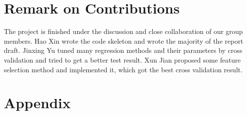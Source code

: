 \documentclass{article}
\begin{document}


\section{Remark on Contributions}
The project is finished under the discussion and close collaboration of our group members. Hao Xin wrote the code skeleton and wrote the majority of the report draft. Jinxing Yu tuned many regression methods and their parameters by cross validation and tried to get a better test result. Xun Jian proposed some feature selection method and implemented it, which got the best cross validation result.

\section*{Appendix}
\end{document}

